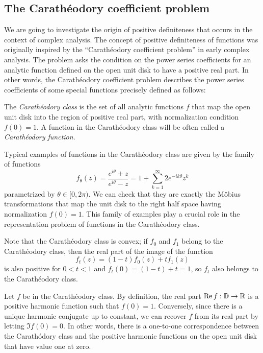 \documentclass{../../small}
\begin{document}
\subsection{The Carath\'eodory coefficient problem}

We are going to investigate the origin of positive definiteness that occurs in the context of complex analysis.
The concept of positive definiteness of functions was originally inspired by the ``Carath\'eodory coefficient problem'' in early complex analysis.
The problem asks the condition on the power series coefficients for an analytic function defined on the open unit disk to have a positive real part.
In other words, the Carath\'eodory coefficient problem describes the power series coefficients of some special functions precisely defined as follows:

\begin{defn}
The \emph{Carath\'eodory class} is the set of all analytic functions $f$ that map the open unit disk into the region of positive real part, with normalization condition $f(0)=1$.
A function in the Carath\'eodory class will be often called a \emph{Carath\'eodory function}.
\end{defn}

\begin{ex}
Typical examples of functions in the Carath\'eodory class are given by the family of functions
\[f_\theta(z)=\frac{e^{i\theta}+z}{e^{i\theta}-z}=1+\sum_{k=1}^\infty2e^{-ik\theta}z^k\]
parametrized by $\theta\in[0,2\pi)$.
We can check that they are exactly the M\"obius transformations that map the unit disk to the right half space having normalization $f(0)=1$.
This family of examples play a crucial role in the representation problem of functions in the Carath\'eodory class.
\end{ex}

\begin{ex}
Note that the Carath\'eodory class is convex; if $f_0$ and $f_1$ belong to the Carath\'eodory class, then the real part of the image of the function
\[f_t(z)=(1-t)f_0(z)+tf_1(z)\]
is also positive for $0<t<1$ and $f_t(0)=(1-t)+t=1$, so $f_t$ also belongs to the Carath\'eodory class.
\end{ex}

\begin{ex}
Let $f$ be in the Carath\'eodory class.
By definition, the real part $\operatorname{Re} f:\mathbb{D}\to\mathbb{R}$ is a positive harmonic function such that $f(0)=1$.
Conversely, since there is a unique harmonic conjugate up to constant, we can recover $f$ from its real part by letting $\Im f(0)=0$.
In other words, there is a one-to-one correspondence between the Carath\'odory class and the positive harmonic functions on the open unit disk that have value one at zero.
\end{ex}
\end{document}
